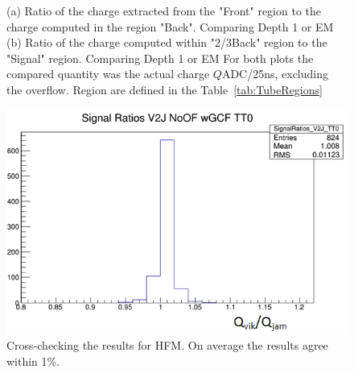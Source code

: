\begin{figure}[htb]
    \begin{center}
        \caption
        {(a) Ratio of the charge extracted from the "Front" region to the charge
         computed in the region "Back". Comparing Depth 1 or EM
         (b) Ratio of the charge computed within "2/3Back" region to the "Signal"
         region. Comparing Depth 1 or EM
         For both plots the compared quantity was the actual charge
         $Q$ADC/25\unit{ns}, excluding the overflow. Region are
         defined in the Table~\ref{tab:TubeRegions}}
        \label{fig:HF_LongUni}
    \end{center}
\end{figure}

\begin{figure}[htb]
    \begin{center}
        \includegraphics[width=.5\textwidth]{figures/ch_hfcalibration/Crosscheck.png}
        \caption{Cross-checking the results for HFM. On average the results agree
        within 1\%.}
        \label{fig:Crosscheck}
    \end{center}
\end{figure}
